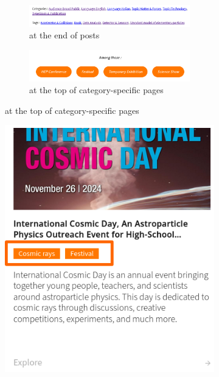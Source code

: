 \bigskip

\begin{figure}[th]
    \begin{subfigure}[c]{.5\textwidth}
        \centering
        \begin{subfigure}[t]{\textwidth}
            \centering
            \includegraphics[width=\textwidth]{Image/Architecture/structure_auto1.png}
            \caption{at the end of posts}
            \label{fig:structure_auto1}
        \end{subfigure}
        
             
        \vspace{2cm}
        \begin{subfigure}[c]{\textwidth}
            \centering
            \includegraphics[width=\textwidth]{Image/Architecture/structure_auto2.png}
            \caption{at the top of category-specific pages}
            \label{fig:structure_auto2}
        \end{subfigure}
    \end{subfigure}
    \hfill  %
    \begin{subfigure}[c]{.4\textwidth}
        \includegraphics[width=\textwidth]{Image/Architecture/structure_auto3.png}

\end{subfigure}
\end{figure}
